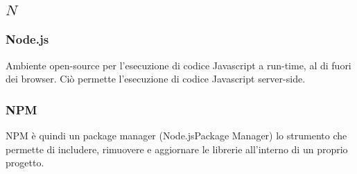 \subsection*{\quad$N\quad$}
\subsubsection*{Node.js}
Ambiente open-source per l'esecuzione di codice Javascript a run-time, al di fuori dei browser. Ciò permette l'esecuzione di codice Javascript server-side.

\subsubsection*{NPM}
NPM è quindi un package manager (Node.js\glosp Package Manager) lo strumento che permette di includere, rimuovere e aggiornare le librerie all'interno di un proprio progetto.

